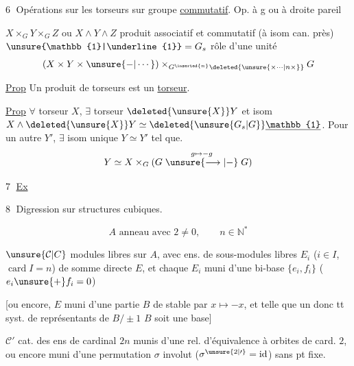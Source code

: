 \textcircled{6} Opérations  sur les torseurs sur groupe \uline{commutatif}. Op. à g ou à droite pareil

$X\times_G Y\times_G Z$ ou  $X\wedge Y\wedge Z$ produit associatif et commutatif (à isom can. près) $\unsure{\mathbb{1}|\underline{1}}=G_s$  rôle d'une unité
\[
 (X\times Y\times\unsure{-|\cdots})\times_{G^{\inserted{n}}\deleted{\unsure{\times\cdots|n\times}}}G
\]

\uline{Prop} Un produit de torseurs est un \uline{torseur}.


\uline{Prop} $\forall$ torseur $X$, $\exists$ torseur $\deleted{\unsure{X}}Y$ et isom $X\wedge\deleted{\unsure{X}}Y\simeq\deleted{\unsure{G_s|G}}\underline{\mathbb{1}}$. Pour un autre $Y'$, $\exists$ isom unique $Y\simeq Y'$ tel que.
\[
 Y\simeq X\times_G(G\overset{g\mapsto-g}{\mathrel{\unsure{\longrightarrow|-}}}G)
\]

\textcircled{7} \uline{Ex}  


\textcircled{8} Digression sur structures cubiques.

\[
 A\text{ anneau avec }2\ne0,\qquad n\in\mathbb{N}^{*}
\]

$\unsure{\mathcal{C}|C}$  modules libres  sur $A$, avec  ens. de  sous-modules libres $E_i$ ($i\in I$, $\operatorname{card} I=n$) de somme directe $E$, et chaque $E_i$ muni d'une bi-base $\{e_i,f_i\}$ ($e_i\unsure{+}f_i=0$)

[ou encore, $E$ muni d'une partie $B$ de  stable par $x\longmapsto-x$, et telle que un \textendash{} donc tt \textendash{} syst. de représentants de $B/\pm1$  $B$ soit une base]

$\mathcal{C}'$ cat. des ens  de cardinal $2n$ munis d'une rel. d'équivalence  à orbites de card. $2$, ou encore muni d'une permutation $\sigma$ involut ($\sigma^{\unsure{2|\prime}}=\mathrm{id}$) sans pt fixe.


